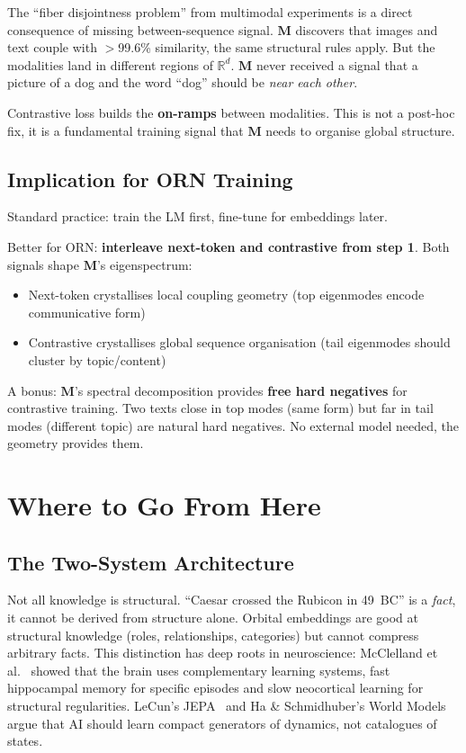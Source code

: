 \documentclass[11pt, a4paper]{article}
\newcommand{\M}{\mathbf{M}}
\newcommand{\R}{\mathbb{R}}
\theoremstyle{remark}
\begin{document}
The ``fiber disjointness problem'' from multimodal experiments is a direct consequence of missing between-sequence signal.
$\M$ discovers that images and text couple with $>$99.6\% similarity, the same structural rules apply.
But the modalities land in different regions of $\R^d$.
$\M$ never received a signal that a picture of a dog and the word ``dog'' should be \emph{near each other}.

Contrastive loss builds the \textbf{on-ramps} between modalities.
This is not a post-hoc fix, it is a fundamental training signal that $\M$ needs to organise global structure.

\subsection{Implication for ORN Training}

Standard practice: train the LM first, fine-tune for embeddings later.

Better for ORN: \textbf{interleave next-token and contrastive from step 1}.
Both signals shape $\M$'s eigenspectrum:
\begin{itemize}[nosep]
    \item Next-token crystallises local coupling geometry (top eigenmodes encode communicative form)
    \item Contrastive crystallises global sequence organisation (tail eigenmodes should cluster by topic/content)
\end{itemize}

A bonus: $\M$'s spectral decomposition provides \textbf{free hard negatives} for contrastive training.
Two texts close in top modes (same form) but far in tail modes (different topic) are natural hard negatives.
No external model needed, the geometry provides them.

\section{Where to Go From Here}
\label{sec:future}

\subsection{The Two-System Architecture}

Not all knowledge is structural.
``Caesar crossed the Rubicon in 49~BC'' is a \emph{fact}, it cannot be derived from structure alone.
Orbital embeddings are good at structural knowledge (roles, relationships, categories) but cannot compress arbitrary facts.
This distinction has deep roots in neuroscience: McClelland et al.~\cite{mcclelland1995} showed that the brain uses complementary learning systems, fast hippocampal memory for specific episodes and slow neocortical learning for structural regularities.
LeCun's JEPA~\cite{lecun2022} and Ha \& Schmidhuber's World Models~\cite{ha2018} argue that AI should learn compact generators of dynamics, not catalogues of states.
\end{document}
